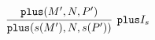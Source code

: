 \documentclass[crop]{standalone} %
\begin{document}
$\displaystyle
\infer[\texttt{plus} I_s]{
    \texttt{plus}(s(M'), N, s(P'))
}{
    \texttt{plus}(M', N, P')
}
$
\end{document}
